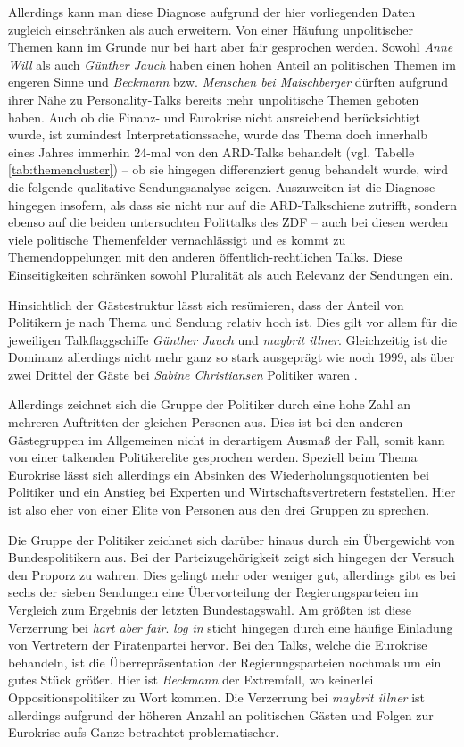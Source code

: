 Allerdings kann man diese Diagnose aufgrund der hier vorliegenden Daten zugleich einschränken als auch erweitern. Von einer Häufung unpolitischer Themen kann im Grunde nur bei hart aber fair gesprochen werden. Sowohl \textit{Anne Will} als auch \textit{Günther Jauch} haben einen hohen Anteil an politischen Themen im engeren Sinne und \textit{Beckmann} bzw. \textit{Menschen bei Maischberger} dürften aufgrund ihrer Nähe zu Personality-Talks bereits mehr unpolitische Themen geboten haben. Auch ob die Finanz- und Eurokrise nicht ausreichend berücksichtigt wurde, ist zumindest Interpretationssache, wurde das Thema doch innerhalb eines Jahres immerhin 24-mal von den ARD-Talks behandelt (vgl. Tabelle \vref{tab:themencluster}) – ob sie hingegen differenziert genug behandelt wurde, wird die folgende qualitative Sendungsanalyse zeigen. Auszuweiten ist die Diagnose hingegen insofern, als dass sie nicht nur auf die ARD-Talkschiene zutrifft, sondern ebenso auf die beiden untersuchten Polittalks des ZDF – auch bei diesen werden viele politische Themenfelder vernachlässigt und es kommt zu Themendoppelungen mit den anderen öffentlich-rechtlichen Talks. Diese Einseitigkeiten schränken sowohl Pluralität als auch Relevanz der Sendungen ein.

Hinsichtlich der Gästestruktur lässt sich resümieren, dass der Anteil von Politikern je nach Thema und Sendung relativ hoch ist. Dies gilt vor allem für die jeweiligen Talkflaggschiffe \textit{Günther Jauch} und \textit{maybrit illner}. Gleichzeitig ist die Dominanz allerdings nicht mehr ganz so stark ausgeprägt wie noch 1999, als über zwei Drittel der Gäste bei \textit{Sabine Christiansen} Politiker waren \parencite[141]{doernerPolitainmentPolitikMedialen2001}.

Allerdings zeichnet sich die Gruppe der Politiker durch eine hohe Zahl an mehreren Auftritten der gleichen Personen aus. Dies ist bei den anderen Gästegruppen im Allgemeinen nicht in derartigem Ausmaß der Fall, somit kann von einer talkenden Politikerelite gesprochen werden. Speziell beim Thema Eurokrise lässt sich allerdings ein Absinken des Wiederholungsquotienten bei Politiker und ein Anstieg bei Experten und Wirtschaftsvertretern feststellen. Hier ist also eher von einer Elite von Personen aus den drei Gruppen zu sprechen.

Die Gruppe der Politiker zeichnet sich darüber hinaus durch ein Übergewicht von Bundespolitikern aus. Bei der Parteizugehörigkeit zeigt sich hingegen der Versuch den Proporz zu wahren. Dies gelingt mehr oder weniger gut, allerdings gibt es bei sechs der sieben Sendungen eine Übervorteilung der Regierungsparteien im Vergleich zum Ergebnis der letzten Bundestagswahl. Am größten ist diese Verzerrung bei \textit{hart aber fair}. \textit{log in} sticht hingegen durch eine häufige Einladung von Vertretern der Piratenpartei hervor. Bei den Talks, welche die Eurokrise behandeln, ist die Überrepräsentation der Regierungsparteien nochmals um ein gutes Stück größer. Hier ist \textit{Beckmann} der Extremfall, wo keinerlei Oppositionspolitiker zu Wort kommen. Die Verzerrung bei \textit{maybrit illner} ist allerdings aufgrund der höheren Anzahl an politischen Gästen und Folgen zur Eurokrise aufs Ganze betrachtet problematischer.

